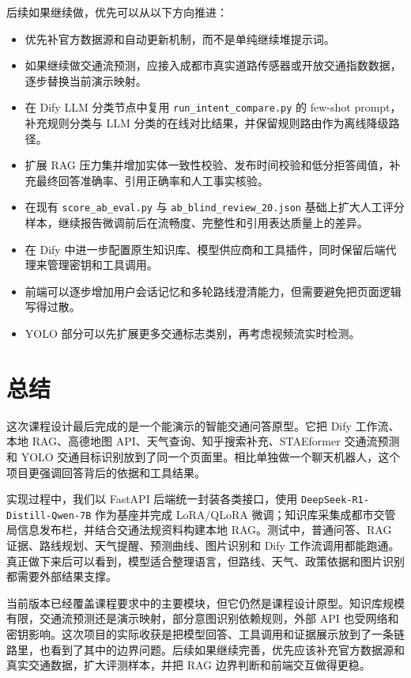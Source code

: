 \documentclass[bwprint]{report}
\begin{document}
后续如果继续做，优先可以从以下方向推进：
\begin{itemize}
    \item 优先补官方数据源和自动更新机制，而不是单纯继续堆提示词。
    \item 如果继续做交通流预测，应接入成都市真实道路传感器或开放交通指数数据，逐步替换当前演示映射。
    \item 在 Dify LLM 分类节点中复用 \texttt{run\_intent\_compare.py} 的 few-shot prompt，补充规则分类与 LLM 分类的在线对比结果，并保留规则路由作为离线降级路径。
    \item 扩展 RAG 压力集并增加实体一致性校验、发布时间校验和低分拒答阈值，补充最终回答准确率、引用正确率和人工事实核验。
    \item 在现有 \texttt{score\_ab\_eval.py} 与 \texttt{ab\_blind\_review\_20.json} 基础上扩大人工评分样本，继续报告微调前后在流畅度、完整性和引用表达质量上的差异。
    \item 在 Dify 中进一步配置原生知识库、模型供应商和工具插件，同时保留后端代理来管理密钥和工具调用。
    \item 前端可以逐步增加用户会话记忆和多轮路线澄清能力，但需要避免把页面逻辑写得过散。
    \item YOLO 部分可以先扩展更多交通标志类别，再考虑视频流实时检测。
\end{itemize}

\section{总结}
这次课程设计最后完成的是一个能演示的智能交通问答原型。它把 Dify 工作流、本地 RAG、高德地图 API、天气查询、知乎搜索补充、STAEformer 交通流预测和 YOLO 交通目标识别放到了同一个页面里。相比单独做一个聊天机器人，这个项目更强调回答背后的依据和工具结果。

实现过程中，我们以 FastAPI 后端统一封装各类接口，使用 \texttt{DeepSeek-R1-Distill-Qwen-7B} 作为基座并完成 LoRA/QLoRA 微调；知识库采集成都市交管局信息发布栏，并结合交通法规资料构建本地 RAG。测试中，普通问答、RAG 证据、路线规划、天气提醒、预测曲线、图片识别和 Dify 工作流调用都能跑通。真正做下来后可以看到，模型适合整理语言，但路线、天气、政策依据和图片识别都需要外部结果支撑。

当前版本已经覆盖课程要求中的主要模块，但它仍然是课程设计原型。知识库规模有限，交通流预测还是演示映射，部分意图识别依赖规则，外部 API 也受网络和密钥影响。这次项目的实际收获是把模型回答、工具调用和证据展示放到了一条链路里，也看到了其中的边界问题。后续如果继续完善，优先应该补充官方数据源和真实交通数据，扩大评测样本，并把 RAG 边界判断和前端交互做得更稳。
\end{document}
